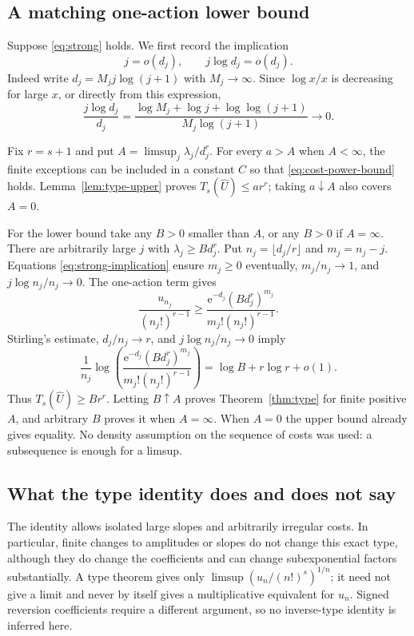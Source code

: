 \documentclass[11pt,a4paper]{article}
\numberwithin{equation}{section}
\theoremstyle{definition}
\theoremstyle{remark}
\theoremstyle{definition}
\newcommand{\U}{\widehat U}
\newcommand{\e}{\mathrm e}
\begin{document}
\subsection{A matching one-action lower bound}
Suppose \eqref{eq:strong} holds. We first record the implication
\begin{equation}
 j=o(d_j),\qquad j\log d_j=o(d_j).
 \label{eq:strong-implication}
\end{equation}
Indeed write $d_j=M_jj\log(j+1)$ with $M_j\to\infty$. Since
$\log x/x$ is decreasing for large $x$, or directly from this expression,
\[
 \frac{j\log d_j}{d_j}
 =\frac{\log M_j+\log j+\log\log(j+1)}{M_j\log(j+1)}\longrightarrow0.
\]

Fix $r=s+1$ and put $A=\limsup_j\lambda_j/d_j^r$.
For every $a>A$ when $A<\infty$, the finite exceptions can be included
in a constant $C$ so that \eqref{eq:cost-power-bound} holds.
Lemma~\ref{lem:type-upper} proves $T_s(\U)\le ar^r$; taking $a\downarrow A$
also covers $A=0$.

For the lower bound take any $B>0$ smaller than $A$, or any $B>0$ if
$A=\infty$. There are arbitrarily large $j$ with
$\lambda_j\ge B d_j^r$. Put
$n_j=\lfloor d_j/r\rfloor$ and $m_j=n_j-j$. Equations
\eqref{eq:strong-implication} ensure $m_j\ge0$ eventually,
$m_j/n_j\to1$, and $j\log n_j/n_j\to0$. The one-action term gives
\[
 \frac{u_{n_j}}{(n_j!)^{r-1}}
 \ge\frac{\e^{-d_j}(B d_j^r)^{m_j}}
                 {m_j!(n_j!)^{r-1}}.
\]
Stirling's estimate, $d_j/n_j\to r$, and
$j\log n_j/n_j\to0$ imply
\begin{equation}
 \frac1{n_j}\log\left(
 \frac{\e^{-d_j}(B d_j^r)^{m_j}}
                       {m_j!(n_j!)^{r-1}}\right)
       =\log B+r\log r+o(1).
 \label{eq:lower-type}
\end{equation}
Thus $T_s(\U)\ge Br^r$. Letting $B\uparrow A$ proves
Theorem~\ref{thm:type} for finite positive $A$, and arbitrary $B$ proves
it when $A=\infty$. When $A=0$ the upper bound already gives equality.
No density assumption on the sequence of costs was used: a subsequence
is enough for a limsup.

\subsection{What the type identity does and does not say}
The identity allows isolated large slopes and arbitrarily irregular
costs. In particular, finite changes to amplitudes or slopes do not
change this exact type, although they do change the coefficients and
can change subexponential factors substantially. A type theorem gives
only
$\limsup (u_n/(n!)^s)^{1/n}$; it need not give a limit and never by
itself gives a multiplicative equivalent for $u_n$. Signed reversion
coefficients require a different argument, so no inverse-type identity
is inferred here.
\end{document}
